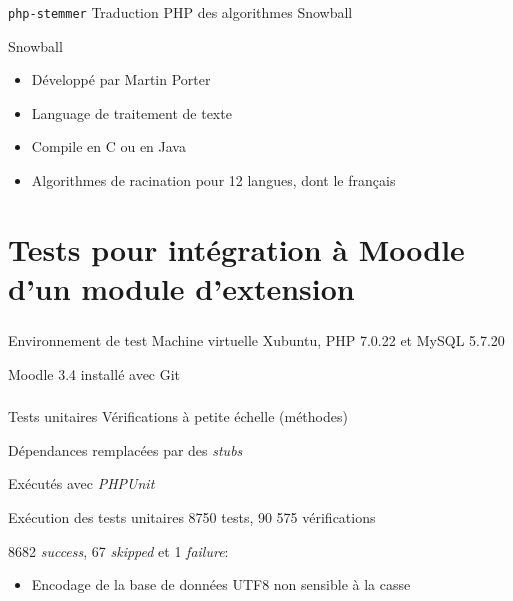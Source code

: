 \documentclass{beamer}
\begin{document}
  \begin{frame}
    \frametitle{\insertsection}
    \begin{block}{\texttt{php-stemmer}}
      Traduction PHP des algorithmes Snowball
    \end{block}
  
    \vfill
  
    \begin{block}{Snowball}
      \begin{itemize}
        \item D\'evelopp\'e par Martin Porter
        \item Language de traitement de texte
        \item Compile en C ou en Java
        \item Algorithmes de racination pour 12 langues, dont le fran\c{c}ais
      \end{itemize}
    \end{block}
    \vfill
  \end{frame}
  
  \section[Tests]{Tests pour int\'egration \`a Moodle d'un module d'extension}
  \begin{frame}
    \frametitle{\insertsection}
    \begin{block}{Environnement de test}
      Machine virtuelle Xubuntu, PHP 7.0.22 et MySQL 5.7.20
      
      Moodle 3.4 install\'e avec Git
    \end{block}
  \end{frame}
  
  \begin{frame}
    \frametitle{\insertsection}
    \begin{block}{Tests unitaires}
      V\'erifications \`a petite \'echelle (m\'ethodes)
  
      D\'ependances remplac\'ees par des \textit{stubs}
  
      Ex\'ecut\'es avec \textit{PHPUnit}
    \end{block}
  
    \vfill
  
    \begin{block}{Ex\'ecution des tests unitaires}
      8750 tests, 90 575 v\'erifications
  
      8682 \textit{success}, 67 \textit{skipped} et 1 \textit{failure}:
      \begin{itemize}
        \item Encodage de la base de donn\'ees UTF8 non sensible \`a la casse
      \end{itemize}
    \end{block}
  \end{frame}
  
\end{document}
